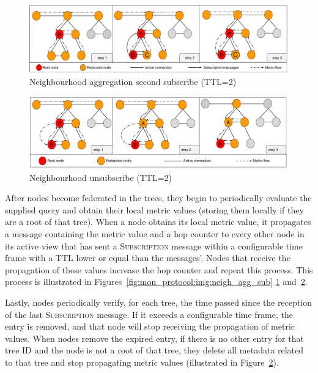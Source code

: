 \begin{figure}[htbp]
    \centering
    \includegraphics[width=\textwidth]{Chapters/aggregation/images/2nd_subscribe.pdf}
    \caption{Neighbourhood aggregation second subscribe (TTL=2)}
    \label{fig:mon_protocol:img:neigh_agg_second_sub}
\end{figure}


\begin{figure}[htbp]
    \centering
    \includegraphics[width=\textwidth]{Chapters/aggregation/images/unsubscribe_process.pdf}
    \caption{Neighbourhood unsubscribe (TTL=2)}
    \label{fig:mon_protocol:img:neigh_agg_unsub}
\end{figure}

After nodes become federated in the trees, they begin to periodically evaluate the supplied query and obtain their local metric values (storing them locally if they are a root of that tree). When a node obtains its local metric value, it propagates a message containing the metric value and a hop counter to every other node in its active view that has sent a \textsc{Subscription} message within a configurable time frame with a TTL lower or equal than the messages'. Nodes that receive the propagation of these values increase the hop counter and repeat this process. This process is illustrated in Figures~\ref{fig:mon_protocol:img:neigh_agg_sub} \ref{fig:mon_protocol:img:neigh_agg_second_sub} and~\ref{fig:mon_protocol:img:neigh_agg_unsub}. 
    
Lastly, nodes periodically verify, for each tree, the time passed since the reception of the last \textsc{Subscription} message. If it exceeds a configurable time frame, the entry is removed, and that node will stop receiving the propagation of metric values. When nodes remove the expired entry, if there is no other entry for that tree ID and the node is not a root of that tree, they delete all metadata related to that tree and stop propagating metric values (illustrated in Figure~\ref{fig:mon_protocol:img:neigh_agg_unsub}).

